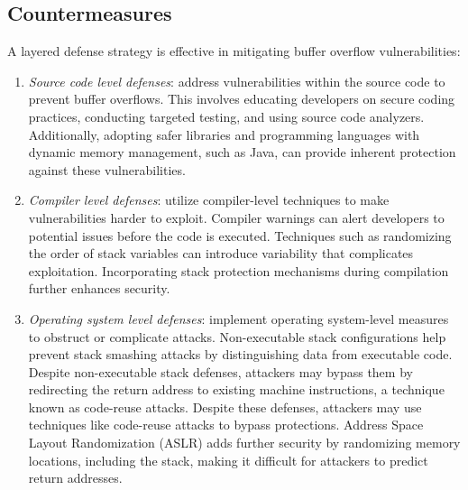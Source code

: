 \subsection{Countermeasures}
A layered defense strategy is effective in mitigating buffer overflow vulnerabilities:
\begin{enumerate}
    \item \textit{Source code level defenses}: address vulnerabilities within the source code to prevent buffer overflows.
        This involves educating developers on secure coding practices, conducting targeted testing, and using source code analyzers.
        Additionally, adopting safer libraries and programming languages with dynamic memory management, such as Java, can provide inherent protection against these vulnerabilities.
    \item \textit{Compiler level defenses}: utilize compiler-level techniques to make vulnerabilities harder to exploit.
        Compiler warnings can alert developers to potential issues before the code is executed. 
        Techniques such as randomizing the order of stack variables can introduce variability that complicates exploitation.
        Incorporating stack protection mechanisms during compilation further enhances security.
    \item \textit{Operating system level defenses}: implement operating system-level measures to obstruct or complicate attacks.
        Non-executable stack configurations help prevent stack smashing attacks by distinguishing data from executable code.
        Despite non-executable stack defenses, attackers may bypass them by redirecting the return address to existing machine instructions, a technique known as code-reuse attacks. 
        Despite these defenses, attackers may use techniques like code-reuse attacks to bypass protections.
        Address Space Layout Randomization (ASLR) adds further security by randomizing memory locations, including the stack, making it difficult for attackers to predict return addresses.
\end{enumerate}

